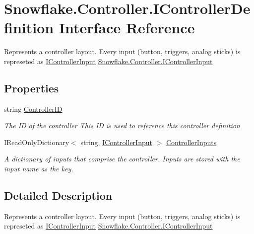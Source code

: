 \hypertarget{interface_snowflake_1_1_controller_1_1_i_controller_definition}{}\section{Snowflake.\+Controller.\+I\+Controller\+Definition Interface Reference}
\label{interface_snowflake_1_1_controller_1_1_i_controller_definition}


Represents a controller layout. Every input (button, triggers, analog sticks) is represeted as \hyperlink{interface_snowflake_1_1_controller_1_1_i_controller_input}{I\+Controller\+Input} \hyperlink{interface_snowflake_1_1_controller_1_1_i_controller_input}{Snowflake.\+Controller.\+I\+Controller\+Input}  


\subsection*{Properties}
\begin{DoxyCompactItemize}
\item 
string \hyperlink{interface_snowflake_1_1_controller_1_1_i_controller_definition_a91b1721244d428e39c1833bd82a7c420}{Controller\+I\+D}
\begin{DoxyCompactList}\small\item\em The I\+D of the controller This I\+D is used to reference this controller definition \end{DoxyCompactList}\item 
I\+Read\+Only\+Dictionary$<$ string, \hyperlink{interface_snowflake_1_1_controller_1_1_i_controller_input}{I\+Controller\+Input} $>$ \hyperlink{interface_snowflake_1_1_controller_1_1_i_controller_definition_a3d0737e0a8d939836e8c453c8f6625aa}{Controller\+Inputs}
\begin{DoxyCompactList}\small\item\em A dictionary of inputs that comprise the controller. Inputs are stored with the input name as the key. \end{DoxyCompactList}\end{DoxyCompactItemize}


\subsection{Detailed Description}
Represents a controller layout. Every input (button, triggers, analog sticks) is represeted as \hyperlink{interface_snowflake_1_1_controller_1_1_i_controller_input}{I\+Controller\+Input} \hyperlink{interface_snowflake_1_1_controller_1_1_i_controller_input}{Snowflake.\+Controller.\+I\+Controller\+Input} 



